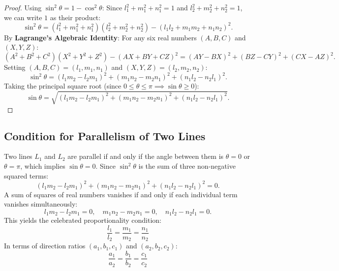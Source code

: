 \begin{proof}
Using $\sin^2\theta = 1 - \cos^2\theta$:
Since $l_1^2+m_1^2+n_1^2 = 1$ and $l_2^2+m_2^2+n_2^2 = 1$, we can write $1$ as their product:
\begin{equation}
    \sin^2\theta = (l_1^2 + m_1^2 + n_1^2)(l_2^2 + m_2^2 + n_2^2) - (l_1 l_2 + m_1 m_2 + n_1 n_2)^2.
\end{equation}
By \textbf{Lagrange's Algebraic Identity}:
For any six real numbers $(A, B, C)$ and $(X, Y, Z)$:
\begin{equation}
    (A^2 + B^2 + C^2)(X^2 + Y^2 + Z^2) - (AX + BY + CZ)^2 = (AY - BX)^2 + (BZ - CY)^2 + (CX - AZ)^2.
\end{equation}
Setting $(A, B, C) = (l_1, m_1, n_1)$ and $(X, Y, Z) = (l_2, m_2, n_2)$:
\begin{equation}
    \sin^2\theta = (l_1 m_2 - l_2 m_1)^2 + (m_1 n_2 - m_2 n_1)^2 + (n_1 l_2 - n_2 l_1)^2.
\end{equation}
Taking the principal square root (since $0 \le \theta \le \pi \implies \sin\theta \ge 0$):
\begin{equation}
    \sin\theta = \sqrt{(l_1 m_2 - l_2 m_1)^2 + (m_1 n_2 - m_2 n_1)^2 + (n_1 l_2 - n_2 l_1)^2}.
\end{equation}
\end{proof}

\subsection{Condition for Parallelism of Two Lines}
Two lines $L_1$ and $L_2$ are parallel if and only if the angle between them is $\theta = 0$ or $\theta = \pi$, which implies $\sin\theta = 0$.
Since $\sin^2\theta$ is the sum of three non-negative squared terms:
\begin{equation}
    (l_1 m_2 - l_2 m_1)^2 + (m_1 n_2 - m_2 n_1)^2 + (n_1 l_2 - n_2 l_1)^2 = 0.
\end{equation}
A sum of squares of real numbers vanishes if and only if each individual term vanishes simultaneously:
\begin{equation}
    l_1 m_2 - l_2 m_1 = 0, \quad m_1 n_2 - m_2 n_1 = 0, \quad n_1 l_2 - n_2 l_1 = 0.
\end{equation}
This yields the celebrated proportionality condition:
\begin{equation}
    \boxed{\frac{l_1}{l_2} = \frac{m_1}{m_2} = \frac{n_1}{n_2}}
\end{equation}
In terms of direction ratios $(a_1, b_1, c_1)$ and $(a_2, b_2, c_2)$:
\begin{equation}
    \boxed{\frac{a_1}{a_2} = \frac{b_1}{b_2} = \frac{c_1}{c_2}}
\end{equation}

